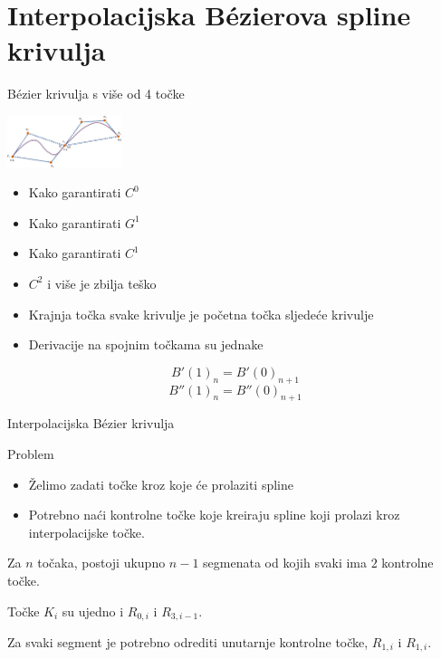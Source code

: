 \documentclass[9pt]{beamer}
\begin{document}
\section{Interpolacijska B\'{e}zierova spline krivulja}
\begin{frame}{B\'{e}zier krivulja s više od 4 točke}
	\begin{center}
		\includegraphics[height=1.5cm]{./slike/bez_vise_od_4.png}
	\end{center}
	\begin{itemize}
		\item Kako garantirati $C^{0}$
		\item Kako garantirati $G^{1}$
		\item Kako garantirati $C^{1}$
		\item $C^{2}$ i više je zbilja teško
	\end{itemize}
	\begin{itemize}
		\item Krajnja točka svake krivulje je početna točka sljedeće krivulje
		\item Derivacije na spojnim točkama su jednake
	\end{itemize}
	\[B'(1)_n = B'(0)_{n+1}\]
	\[B''(1)_n = B''(0)_{n+1}\]
\end{frame}

\begin{frame}{Interpolacijska B\'{e}zier krivulja}
	\begin{block}{Problem}
		\begin{itemize}
			\item Želimo zadati točke kroz koje će prolaziti spline
			\item Potrebno naći kontrolne točke koje kreiraju spline koji prolazi kroz interpolacijske točke.
		\end{itemize}
	\end{block}
	
	Za $n$ točaka, postoji ukupno $n-1$ segmenata od kojih svaki ima $2$ kontrolne točke. 
	
	Točke $K_i$ su ujedno i $R_{0, i}$ i $R_{3, i-1}$.
	
	Za svaki segment je potrebno odrediti unutarnje kontrolne točke, $R_{1,i}$ i $R_{1, i}$.
	
\end{frame}
\end{document}

